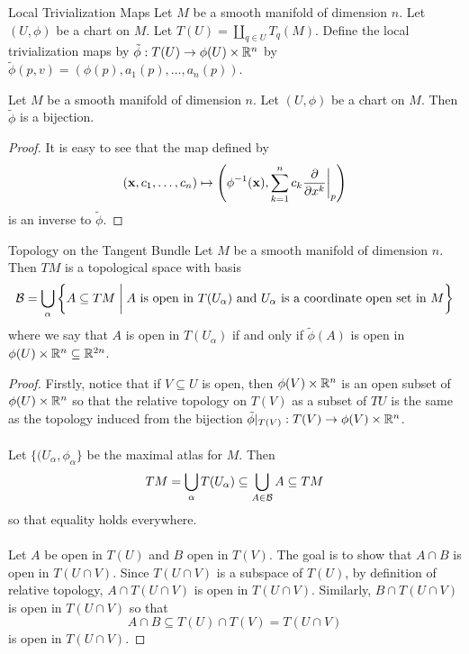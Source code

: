 \documentclass[a4paper]{article}
\begin{document}
\begin{defn}{Local Trivialization Maps}{} Let $M$ be a smooth manifold of dimension $n$. Let $(U,\phi)$ be a chart on $M$. Let $T(U)=\coprod_{q\in U}T_q(M)$. Define the local trivialization maps by $\tilde{\phi}:T(U)\to\phi(U)\times\mathbb{R}^n$ by $\tilde{\phi}(p,v)=(\phi(p),a_1(p),\dots,a_n(p))$. 
\end{defn}

\begin{lmm}{}{} Let $M$ be a smooth manifold of dimension $n$. Let $(U,\phi)$ be a chart on $M$. Then $\tilde{\phi}$ is a bijection. \tcbline
\begin{proof}
It is easy to see that the map defined by $$(\vb{x},c_1,\dots,c_n)\mapsto\left(\phi^{-1}(\vb{x}),\sum_{k=1}^nc_k\frac{\partial}{\partial x^k}\bigg{|}_p\right)$$ is an inverse to $\tilde{\phi}$. 
\end{proof}
\end{lmm}

\begin{thm}{Topology on the Tangent Bundle}{} Let $M$ be a smooth manifold of dimension $n$. Then $TM$ is a topological space with basis $$\mathcal{B}=\bigcup_{\alpha}\left\{A\subseteq TM\;\bigg{|}\;A\text{ is open in } T(U_\alpha)\text{ and } U_\alpha\text{ is a coordinate open set in }M\right\}$$ where we say that $A$ is open in $T(U_\alpha)$ if and only if $\tilde{\phi}(A)$ is open in $\phi(U)\times\mathbb{R}^n\subseteq\mathbb{R}^{2n}$. \tcbline
\begin{proof}
Firstly, notice that if $V\subseteq U$ is open, then $\phi(V)\times\mathbb{R}^n$ is an open subset of $\phi(U)\times\mathbb{R}^n$ so that the relative topology on $T(V)$ as a subset of $TU$ is the same as the topology induced from the bijection $\tilde{\phi}|_{T(V)}:T(V)\to\phi(V)\times\mathbb{R}^n$. \\~\\

Let $\{(U_\alpha,\phi_\alpha\}$ be the maximal atlas for $M$. Then $$TM=\bigcup_{\alpha}T(U_\alpha)\subseteq\bigcup_{A\in\mathcal{B}}A\subseteq TM$$ so that equality holds everywhere. \\~\\

Let $A$ be open in $T(U)$ and $B$ open in $T(V)$. The goal is to show that $A\cap B$ is open in $T(U\cap V)$. Since $T(U\cap V)$ is a subspace of $T(U)$, by definition of relative topology, $A\cap T(U\cap V)$ is open in $T(U\cap V)$. Similarly, $B\cap T(U\cap V)$ is open in $T(U\cap V)$ so that $$A\cap B\subseteq T(U)\cap T(V)=T(U\cap V)$$ is open in $T(U\cap V)$. 
\end{proof}
\end{thm}
\end{document}
